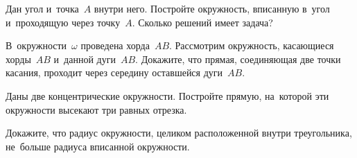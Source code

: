 \begin{problems}
\item
Дан угол и~точка~$A$ внутри него.
Постройте окружность, вписанную в~угол и~проходящую через точку~$A$.
Сколько решений имеет задача?

\item{}
В~окружности~$\omega$ проведена хорда~$AB$.
Рассмотрим окружность, касающиеся хорды~$AB$ и~данной дуги~$AB$.
Докажите, что прямая, соединяющая две точки касания, проходит через середину
оставшейся дуги~$AB$.

\item
Даны две концентрические окружности.
Постройте прямую, на~которой эти окружности высекают три равных отрезка.

\item
Докажите, что радиус окружности, целиком расположенной внутри треугольника,
не~больше радиуса вписанной окружности.

\end{problems}

\endgroup %

